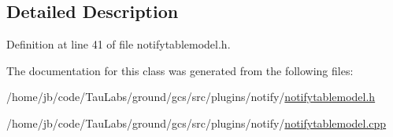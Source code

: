\subsection{\-Detailed \-Description}


\-Definition at line 41 of file notifytablemodel.\-h.



\-The documentation for this class was generated from the following files\-:\begin{DoxyCompactItemize}
\item 
/home/jb/code/\-Tau\-Labs/ground/gcs/src/plugins/notify/\hyperlink{notifytablemodel_8h}{notifytablemodel.\-h}\item 
/home/jb/code/\-Tau\-Labs/ground/gcs/src/plugins/notify/\hyperlink{notifytablemodel_8cpp}{notifytablemodel.\-cpp}\end{DoxyCompactItemize}
